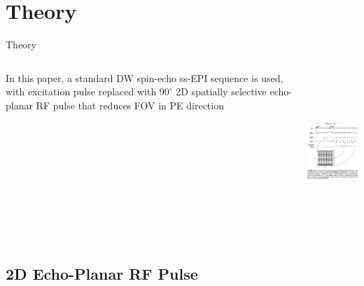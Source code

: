 \documentclass{beamer}
\begin{document}
\section{Theory}

\begin{frame}{Theory}
\begin{columns}[T]
	\begin{column}[T]{5cm}
		In this paper, a standard DW spin-echo ss-EPI sequence is used, with excitation pulse replaced with $90^{\circ}$ 2D spatially selective echo-planar RF pulse that reduces FOV in PE direction
	\end{column}
	\begin{column}[T]{5cm}
		\includegraphics[height=6cm]{BushbergEPI}
	\end{column}
\end{columns}
\end{frame}

\subsection{2D Echo-Planar RF Pulse}
\end{document}
